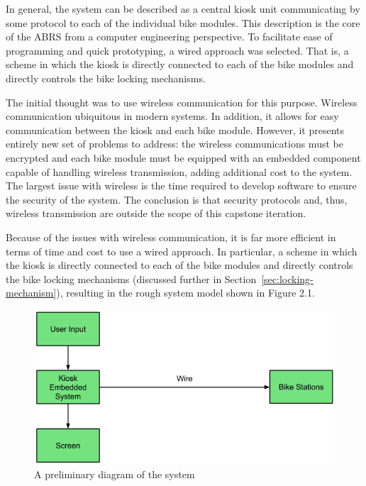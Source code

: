 \documentclass[11pt,a4paper,onesides]{report}
\begin{document}
In general, the system can be described as a central kiosk unit communicating by some protocol to each of the individual bike modules.  This description is the core of the ABRS from a computer engineering perspective.  To facilitate ease of programming and quick prototyping, a wired approach was selected.  That is, a scheme in which the kiosk is directly connected to each of the bike modules and directly controls the bike locking mechanisms.  

The initial thought was to use wireless communication for this purpose.  Wireless communication ubiquitous in modern systems.  In addition, it allows for easy communication between the kiosk and each bike module.  However, it presents entirely new set of problems to address: the wireless communications must be encrypted and each bike module must be equipped with an embedded component capable of handling wireless transmission, adding additional cost to the system.  The largest issue with wireless is the time required to develop software to ensure the security of the system.  The conclusion is that security protocols and, thus, wireless transmission are outside the scope of this capstone iteration.  

Because of the issues with wireless communication,  it is far more efficient in terms of time and cost to use a wired approach.  In particular, a scheme in which the kiosk is directly connected to each of the bike modules and directly controls the bike locking mechanisms (discussed further in Section~\ref{sec:locking-mechanism}), resulting in the rough system model shown in Figure 2.1. 


\begin{figure}[h]
	\begin{center}
		\includegraphics[scale = 0.6]{initial-diagram}
	\end{center}
\caption{A preliminary diagram of the system}

\end{figure}
\end{document}
